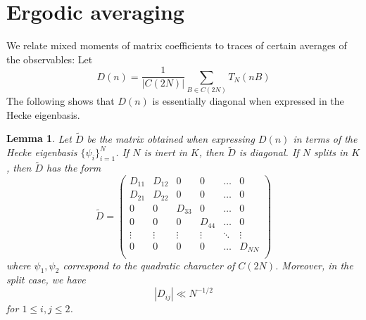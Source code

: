 \documentclass[12pt]{amsart}
\newtheorem{lem}[thm]{Lemma}%
\theoremstyle{plain}
\newcommand{\T}{\TN}
\newcommand{\TN}{T_N}  %
\newcommand{\OPN}{\operatorname{Op}_N}
\newcommand{\op}{\OPN}
\newcommand{\torusN}{C(2N)}%
\renewcommand{\^}{\widehat}
\begin{document}

\section{Ergodic averaging}
\label{sec:trace-trick}
We relate mixed moments of matrix coefficients to traces of certain
averages of the observables:  Let 
\begin{equation}
  \label{eq:definiton-of-D}
D(n)=
\frac{1}{|\torusN|}
\sum_{B \in \torusN}
\T(nB)
\end{equation}
The following shows that $D(n)$ is essentially diagonal when expressed in
the Hecke  eigenbasis.
\begin{lem}
\label{lem:almost-diagonal}
Let $\tilde{D}$ be the matrix obtained when expressing $D(n)$ in terms of
the 
Hecke eigenbasis $\{ \psi_i \}_{i=1}^N$.   If $N$ is inert in 
$K$, then $\tilde{D}$ is diagonal. 
If $N$ splits in $K$, then $\tilde{D}$ has the form
$$
\tilde{D}=
\begin{pmatrix}
D_{11} & D_{12} & 0 & 0 & \ldots & 0\\  
D_{21} & D_{22} & 0 & 0 & \ldots & 0\\  
0  & 0  & D_{33} & 0 & \ldots  & 0\\  
0 & 0  & 0  & D_{44} &  \ldots & 0\\  
\vdots & \vdots  & \vdots  & \vdots &  \ddots & \vdots\\  
0 & 0  & 0  & 0 &  \ldots & D_{NN}\\  
\end{pmatrix}
$$
where $\psi_1, \psi_2$ correspond to the quadratic character of
$\torusN$.  Moreover, in the split case, we have
$$|D_{ij}| \ll N^{-1/2}$$
for $1 \leq i,j \leq 2$.


\end{lem}
\end{document}
